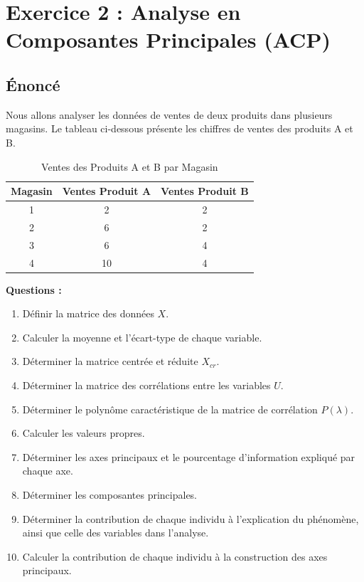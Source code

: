 \documentclass[11pt,a4paper]{article}
\begin{document}
\newpage

\section{Exercice 2 : Analyse en Composantes Principales (ACP)}

\subsection{Énoncé}

Nous allons analyser les données de ventes de deux produits dans plusieurs magasins. Le tableau ci-dessous présente les chiffres de ventes des produits A et B.

\begin{table}[h]
\centering
\begin{tabular}{|c|c|c|}
\hline
\textbf{Magasin} & \textbf{Ventes Produit A} & \textbf{Ventes Produit B} \\
\hline
1 & 2 & 2 \\
\hline
2 & 6 & 2 \\
\hline
3 & 6 & 4 \\
\hline
4 & 10 & 4 \\
\hline
\end{tabular}
\caption{Ventes des Produits A et B par Magasin}
\end{table}

\textbf{Questions :}
\begin{enumerate}
    \item Définir la matrice des données $X$.
    \item Calculer la moyenne et l'écart-type de chaque variable.
    \item Déterminer la matrice centrée et réduite $X_{cr}$.
    \item Déterminer la matrice des corrélations entre les variables $U$.
    \item Déterminer le polynôme caractéristique de la matrice de corrélation $P(\lambda)$.
    \item Calculer les valeurs propres.
    \item Déterminer les axes principaux et le pourcentage d'information expliqué par chaque axe.
    \item Déterminer les composantes principales.
    \item Déterminer la contribution de chaque individu à l'explication du phénomène, ainsi que celle des variables dans l'analyse.
    \item Calculer la contribution de chaque individu à la construction des axes principaux.
\end{enumerate}
\end{document}
